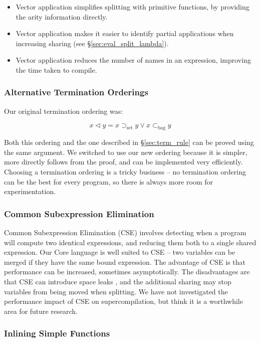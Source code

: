 \documentclass[draft]{sigplanconf}
\newcommand{\setsup}{\supset_{\mathrm{set}}}
\newcommand{\bagsub}{\subset_{\mathrm{bag}}}
\begin{document}
\begin{itemize}
\item Vector application simplifies splitting with primitive functions, by providing the arity information directly.
\item Vector application makes it easier to identify partial applications when increasing sharing (see \S\ref{sec:eval_split_lambda}).
\item Vector application reduces the number of names in an expression, improving the time taken to compile.
\end{itemize}

\subsubsection{Alternative Termination Orderings}

Our original termination ordering was:

\[
x \lhd y = x \setsup y \vee x \bagsub y
\]

Both this ordering and the one described in \S\ref{sec:term_rule} can be proved using the same argument. We switched to use our new ordering because it is simpler, more directly follows from the proof, and can be implemented very efficiently. Choosing a termination ordering is a tricky business -- no termination ordering can be the best for every program, so there is always more room for experimentation.

\subsubsection{Common Subexpression Elimination}

Common Subexpression Elimination (CSE) involves detecting when a program will compute two identical expressions, and reducing them both to a single shared expression. Our Core language is well suited to CSE -- two variables can be merged if they have the same bound expression. The advantage of CSE is that performance can be increased, sometimes asymptotically. The disadvantages are that CSE can introduce space leaks \cite{chitil:cse}, and the additional sharing may stop variables from being moved when splitting. We have not investigated the performance impact of CSE on supercompilation, but think it is a worthwhile area for future research.

\subsubsection{Inlining Simple Functions}
\end{document}

